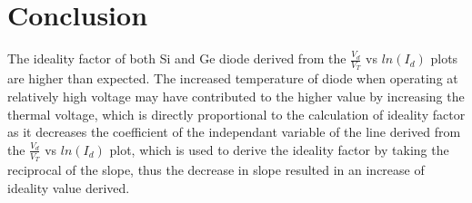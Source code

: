 \documentclass{article}
\begin{document}
\section*{Conclusion}
The ideality factor of both Si and Ge diode derived from the $\frac{V_d}{V_T}$ vs $ln(I_d)$ plots are higher than expected. The increased temperature of diode when operating at relatively high voltage may have contributed to the higher value by increasing the thermal voltage, which is directly proportional to the calculation of ideality factor as it decreases the coefficient of the independant variable of the line derived from the $\frac{V_d}{V_T}$ vs $ln(I_d)$ plot, which is used to derive the ideality factor by taking the reciprocal of the slope, thus the decrease in slope resulted in an increase of ideality value derived.
\end{document}
